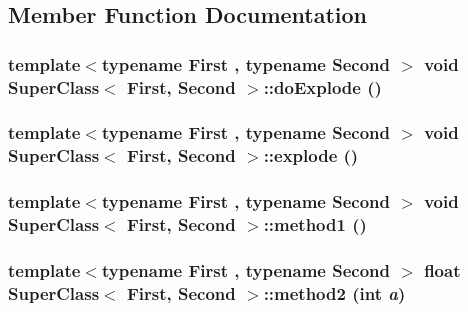\subsection{Member Function Documentation}
\hypertarget{classSuperClass_72c9fd754b4bf124d14bab7ef64f5721}{
\subsubsection[{doExplode}]{\setlength{\rightskip}{0pt plus 5cm}template$<$typename First , typename Second $>$ void {\bf SuperClass}$<$ First, Second $>$::doExplode ()}}
\label{classSuperClass_72c9fd754b4bf124d14bab7ef64f5721}


\hypertarget{classSuperClass_133e840cef38bc1ab588bbd8f8939138}{
\subsubsection[{explode}]{\setlength{\rightskip}{0pt plus 5cm}template$<$typename First , typename Second $>$ void {\bf SuperClass}$<$ First, Second $>$::explode ()}}
\label{classSuperClass_133e840cef38bc1ab588bbd8f8939138}


\hypertarget{classSuperClass_4af674d97b2d5f49e2f7c702e7a10176}{
\subsubsection[{method1}]{\setlength{\rightskip}{0pt plus 5cm}template$<$typename First , typename Second $>$ void {\bf SuperClass}$<$ First, Second $>$::method1 ()}}
\label{classSuperClass_4af674d97b2d5f49e2f7c702e7a10176}


\hypertarget{classSuperClass_0f23effce4d4ffd422ba74fb2746234f}{
\subsubsection[{method2}]{\setlength{\rightskip}{0pt plus 5cm}template$<$typename First , typename Second $>$ float {\bf SuperClass}$<$ First, Second $>$::method2 (int {\em a})}}
\label{classSuperClass_0f23effce4d4ffd422ba74fb2746234f}


